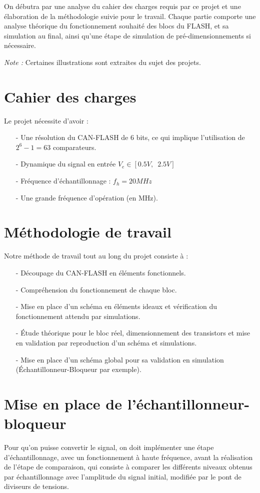 \documentclass[11pt]{article}
\begin{document}
On d\'ebutra par une analyse du cahier des charges requis par ce projet et une \'elaboration de la m\'ethodologie suivie pour le travail. Chaque partie comporte une analyse th\'eorique du fonctionnement souhait\'e des blocs du FLASH, et sa simulation au final, ainsi qu'une \'etape de simulation de pr\'e-dimensionnements si n\'ecessaire.

\textit{Note :} Certaines illustrations sont extraites du sujet des projets\cite{Projets-Analog}.

\section{Cahier des charges}
Le projet n\'ecessite d'avoir :
\begin{itemize}
\item[-] Une r\'esolution du CAN-FLASH de 6 bits, ce qui implique l'utilisation de $2^{6} -1 = 63 $ comparateurs.
\item[-] Dynamique du signal en entr\'ee $V_e \in [0.5 V,\phantom{2} 2.5V]$
\item[-] Fr\'equence d'\'echantillonnage : $f_h = 20 MHz $
\item[-] Une grande fr\'equence d'op\'eration (en MHz).
\end{itemize}

\section{M\'ethodologie de travail}
Notre m\'ethode de travail tout au long du projet consiste \`a :
\begin{itemize}
  \item[-] D\'ecoupage du CAN-FLASH en \'el\'ements fonctionnels.
  \item[-] Compr\'ehension du fonctionnement de chaque bloc.
  \item[-] Mise en place d'un sch\'ema en \'el\'ements ideaux et v\'erification du fonctionnement attendu par simulations.
  \item[-] \'Etude th\'eorique pour le bloc r\'eel, dimensionnement des transistors et mise en validation par reproduction
  d'un sch\'ema et simulations.
  \item[-] Mise en place d'un sch\'ema global pour sa validation en simulation (\'Echantillonneur-Bloqueur par exemple).
\end{itemize}



\clearpage

\section{Mise en place de l'\'echantillonneur-bloqueur}
Pour qu'on puisse convertir le signal, on doit impl\'ementer une \'etape d'\'echantillonnage, avec un fonctionnement \`a haute fr\'equence,
avant la r\'ealisation de l'\'etape de comparaison, qui consiste \`a comparer les diff\'erents niveaux obtenus par \'echantillonnage avec l'amplitude du signal initial,
modifi\'ee par le pont de diviseurs de tensions.
\end{document}
